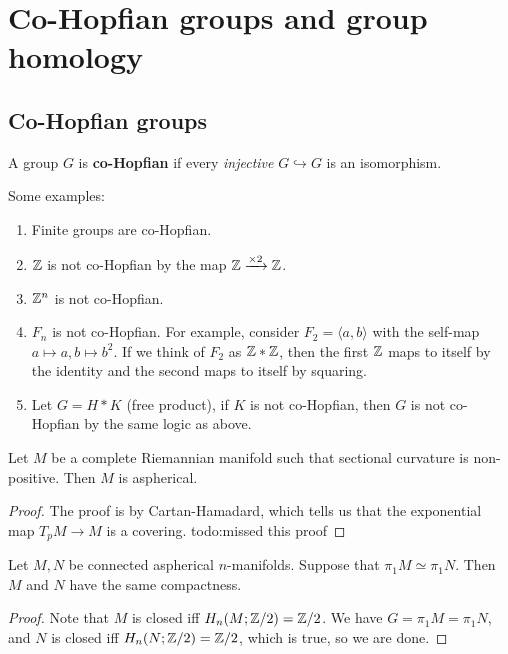 \section{Co-Hopfian groups and group homology} 
\subsection{Co-Hopfian groups}
\begin{definition}[]
    A group $G$ is \textbf{co-Hopfian} if every \emph{injective} $G \hookrightarrow G$ is an isomorphism.
\end{definition}
\begin{example}
    Some examples:
    \begin{enumerate}[label=(\arabic*)]
    \setlength\itemsep{-.2em}
        \item Finite groups are co-Hopfian.
        \item $\mathbb{Z}$ is not co-Hopfian by the map $\mathbb{Z} \xrightarrow{\times 2} \mathbb{Z}$.
        \item $\mathbb{Z}^n $ is not co-Hopfian.
        \item $F_n $ is not co-Hopfian. For example, consider $F_2=\langle a,b \rangle $ with the self-map $a \mapsto a, b \mapsto b^2$. If we think of $F_2$ as $\mathbb{Z} * \mathbb{Z}$, then the first $\mathbb{Z}$ maps to itself by the identity and the second maps to itself by squaring.
        \item Let $G=H *K$ (free product), if $K$ is not co-Hopfian, then $G$ is not co-Hopfian by the same logic as above.
    \end{enumerate}
\end{example}
\begin{lemma}
    Let $M$ be a complete Riemannian manifold such that sectional curvature is non-positive. Then $M$ is aspherical.
\end{lemma}
\begin{proof}
    The proof is by Cartan-Hamadard, which tells us that the exponential map $T_p M \to M$ is a covering. {\color{red}todo:missed this proof} 
\end{proof}
\begin{lemma}
    Let $M,N$ be connected aspherical $n$-manifolds. Suppose that $\pi_1 M \simeq  \pi_1 N$. Then $M$ and $N$ have the same compactness.
\end{lemma}
\begin{proof}
    Note that $M$ is closed iff $H_n (M ; \mathbb{Z} /2)=\mathbb{Z} /2$.  We have $G=\pi_1 M= \pi_1 N$, and $N$ is closed iff $H_n (N; \mathbb{Z} /2) =\mathbb{Z}/2$, which is true, so we are done.
\end{proof}
